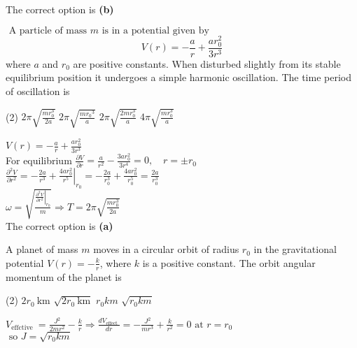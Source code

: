 \begin{enumerate}
\begin{answer}
	The correct option is \textbf{(b)}
\end{answer}
\begin{minipage}{\textwidth}
	\item $\text { A particle of mass } m \text { is in a potential given by }$
	$$V(r)=-\frac{a}{r}+\frac{a r_{0}^{2}}{3 r^{3}}$$
	where $a$ and $r_{0}$ are positive constants. When disturbed slightly from its stable equilibrium position it undergoes a simple harmonic oscillation. The time period of oscillation is
\end{minipage}
\begin{tasks}(2)
	\task[\textbf{A.}] $2 \pi \sqrt{\frac{m r_{0}^{3}}{2 a}}$
	\task[\textbf{B.}]$2 \pi \sqrt{\frac{m r_{0}{ }^{3}}{a}}$
	\task[\textbf{C.}]$2 \pi \sqrt{\frac{2 m r_{0}^{3}}{a}}$
	\task[\textbf{D.}]$4 \pi \sqrt{\frac{m r_{0}^{3}}{a}}$
\end{tasks}
\begin{answer}
	$V(r)=-\frac{a}{r}+\frac{a r_{0}^{2}}{3 r^{3}}$\\
	For equilibrium $\frac{\partial V}{\partial r}=\frac{a}{r^{2}}-\frac{3 a r_{0}^{2}}{3 r^{4}}=0, \quad r=\pm r_{0}$ \\
	$\frac{\partial^{2} V}{\partial r^{2}}=-\frac{2 a}{r^{3}}+\left.\frac{4 a r_{0}^{2}}{r^{5}}\right|_{r_{0}}=-\frac{2 a}{r_{0}^{3}}+\frac{4 a r_{0}^{2}}{r_{0}^{5}}=\frac{2 a}{r_{0}^{3}}$\\
	$\omega=\sqrt{\frac{\left.\frac{\partial^{2} V}{\partial r^{2}}\right|_{r_{0}}}{m}} \Rightarrow T=2 \pi \sqrt{\frac{m r_{0}^{3}}{2 a}}$\\
	The correct option is \textbf{(a)}
\end{answer}
\begin{minipage}{\textwidth}
	\item A planet of mass $m$ moves in a circular orbit of radius $r_{0}$ in the gravitational potential $V(r)=-\frac{k}{r}$, where $k$ is a positive constant. The orbit angular momentum of the planet is
\end{minipage}
\begin{tasks}(2)
	\task[\textbf{A.}] $2 r_{0} \mathrm{~km}$
	\task[\textbf{B.}]$\sqrt{2 r_{0} \mathrm{~km}}$
	\task[\textbf{C.}]$r_{0} k m$
	\task[\textbf{D.}]$\sqrt{r_{0} k m}$
\end{tasks}
\begin{answer}
$V_{\text {effctive }}=\frac{J^{2}}{2 m r^{2}}-\frac{k}{r} \Rightarrow \frac{d V_{\text {effect }}}{d r}=-\frac{J^{2}}{m r^{3}}+\frac{k}{r^{2}}=0 \text { at } r=r_{0}$\\
$\text { so } J=\sqrt{r_{0} k m}$	
\end{answer}

\end{enumerate}